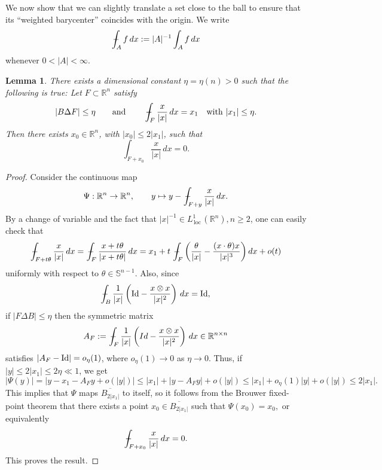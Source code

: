 \documentclass[reqno,11pt]{amsart}
\makeatletter
\def\loc{{\mathop\mathrm{\,loc\,}}}
\newcommand{\R}{\mathbb R}
\newtheorem{lem}[thm]{Lemma}%
\numberwithin{equation}{section}
\theoremstyle{remark}
\newcommand{\mean}[1]{\,-\hskip-1.08em\int_{#1}} %
\makeatother
\begin{document}
We now show that we can slightly translate a set close to the ball to ensure that its ``weighted barycenter'' coincides with the origin.
We write 
$$\mean{A} f\,dx := |A|^{-1}\int_A f\,dx$$
whenever $0<|A|<\infty$.


\begin{lem}\label{translation}
There exists a dimensional constant $\eta=\eta(n)>0$ such that the following is true:
Let $F\subset \R^n$ satisfy 
$$|B\Delta F| \le \eta\qquad \text{and}\qquad \mean{F} \frac {x}{|x|}\, dx=x_1\quad \text{with }|x_1|\leq \eta.$$
 Then there exists   $x_0\in \mathbb R^n$, with $|x_0|\le 2|x_1|$, such that 
$$\int_{F+x_0} \frac {x}{|x|}\, dx=0.$$ 
\end{lem}
\begin{proof}
Consider the continuous map
$$\Psi:\R^n\to \R^n,\qquad  y\mapsto y- \mean{F+y} \frac {x}{|x|}\, dx.$$
By a change of variable and the fact that $|x|^{-1}\in L^1_{\loc}(\mathbb R^n), n\ge 2$, one can easily check that
$$\mean{F+t\theta} \frac {x}{|x|}\, dx=\mean{F} \frac {x+t\theta}{|x+t\theta|}\, dx=x_1+t\mean{F} \bigg(\frac{\theta}{|x|}-\frac{(x\cdot \theta) x}{|x|^3} \bigg)\, dx+o(t)$$
uniformly with respect to $\theta\in\mathbb S^{n-1}$.
Also, since
$$
\mean{B}\frac{1}{|x|}\left({\rm Id}-\frac{x\otimes x}{|x|^2}\right) \, dx= {\rm Id},\,
$$
if $|F\Delta B| \leq \eta$  then the symmetric matrix
$$
A_F:=\mean{F} \frac{1}{|x|}\left(Id-\frac{x\otimes x}{|x|^2}\right) \, dx \in \R^{n\times n}
$$
satisfies $|A_F - {\rm Id}| =o_\eta(1)$, where $o_\eta(1)\to 0$ as $\eta\to 0$.
Thus, if $|y|\leq 2 |x_1|\leq 2\eta \ll 1$, we get
$$
|\Psi(y)|=|y-x_1-A_Fy +o(|y|)|\leq |x_1|+|y -A_Fy|+o(|y|)\leq |x_1|+o_\eta(1) |y|+o(|y|)\leq 2|x_1|.
$$
This implies that
$\Psi$ maps $\overline{B_{2|x_1|}}$ to itself, so it follows from the Brouwer fixed-point theorem that there exists a point $x_0\in \overline{B_{2|x_1|}}$ such that
$\Psi(x_0)=x_0,$
or equivalently
$$\mean{F+x_0} \frac {x}{|x|}\, dx=0.$$
This proves the result.
\end{proof}
\end{document}
